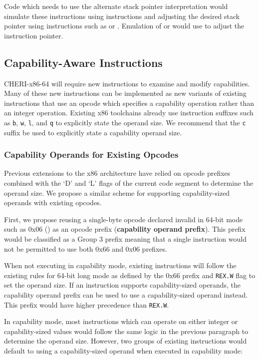 Code which needs to use the alternate stack pointer
interpretation would simulate these instructions using 
instructions and adjusting the desired stack pointer using
instructions such as  or .  Emulation of
 or  would use  to
adjust the instruction pointer.

\subsection{Capability-Aware Instructions}

CHERI-x86-64 will require new instructions to examine and modify
capabilities.  Many of these new instructions can be implemented as
new variants of existing instructions that use an opcode which
specifies a capability operation rather than an integer operation.
Existing x86 toolchains already use instruction suffixes such as
\texttt{b}, \texttt{w}, \texttt{l}, and \texttt{q} to explicitly state
the operand size.  We recommend that the \texttt{c} suffix be used to
explicitly state a capability operand size.

\subsubsection{Capability Operands for Existing Opcodes}

Previous extensions to the x86 architecture have relied on opcode
prefixes combined with the `D' and `L' flags of the current code
segment to determine the operand size.  We propose a similar
scheme for supporting capability-sized operands with existing
opcodes.

First, we propose reusing a single-byte opcode declared invalid in
64-bit mode such as 0x06 () as an opcode prefix
(\textbf{capability operand prefix}).  This prefix would be classified
as a Group 3 prefix meaning that a single instruction would not be
permitted to use both 0x66 and 0x06 prefixes.

When not executing in capability mode, existing instructions will
follow the existing rules for 64-bit long mode as defined by the
0x66 prefix and \texttt{REX.W} flag to set the operand size.  If an
instruction supports capability-sized operands, the capability operand
prefix can be used to use a capability-sized operand instead.  This
prefix would have higher precedence than \texttt{REX.W}.

In capability mode, most instructions which can operate on either
integer or capability-sized values would follow the same logic in the
previous paragraph to determine the operand size.  However, two groups
of existing instructions would default to using a capability-sized
operand when executed in capability mode:

